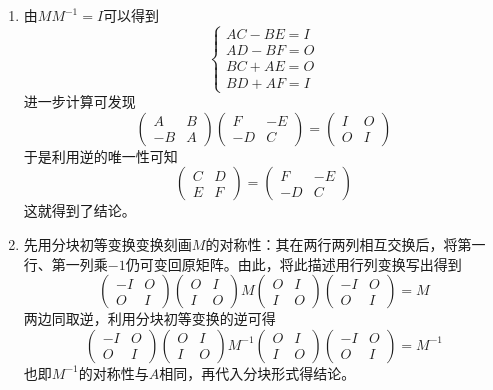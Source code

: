 \documentclass[a4paper,UTF8,fontset=windows]{ctexart}
\begin{document}
\begin{enumerate}
\begin{enumerate}
\begin{enumerate}
            \item
            由$MM^{-1}=I$可以得到
            $$\begin{cases}AC-BE=I\\AD-BF=O\\BC+AE=O\\BD+AF=I\end{cases}$$
            进一步计算可发现
            $$\begin{pmatrix}A&B\\-B&A\end{pmatrix}\begin{pmatrix}F&-E\\-D&C\end{pmatrix}=\begin{pmatrix}I&O\\O&I\end{pmatrix}$$
            于是利用逆的唯一性可知
            $$\begin{pmatrix}C&D\\E&F\end{pmatrix}=\begin{pmatrix}F&-E\\-D&C\end{pmatrix}$$
            这就得到了结论。

            \item 先用分块初等变换变换刻画$M$的对称性：其在两行两列相互交换后，将第一行、第一列乘$-1$仍可变回原矩阵。由此，将此描述用行列变换写出得到
            $$\begin{pmatrix}-I&O\\O&I\end{pmatrix}\begin{pmatrix}O&I\\I&O\end{pmatrix}M\begin{pmatrix}O&I\\I&O\end{pmatrix}\begin{pmatrix}-I&O\\O&I\end{pmatrix}=M$$
            两边同取逆，利用分块初等变换的逆可得
            $$\begin{pmatrix}-I&O\\O&I\end{pmatrix}\begin{pmatrix}O&I\\I&O\end{pmatrix}M^{-1}\begin{pmatrix}O&I\\I&O\end{pmatrix}\begin{pmatrix}-I&O\\O&I\end{pmatrix}=M^{-1}$$
            也即$M^{-1}$的对称性与$A$相同，再代入分块形式得结论。
        \end{enumerate}


\end{enumerate}
\end{enumerate}
\end{document}
